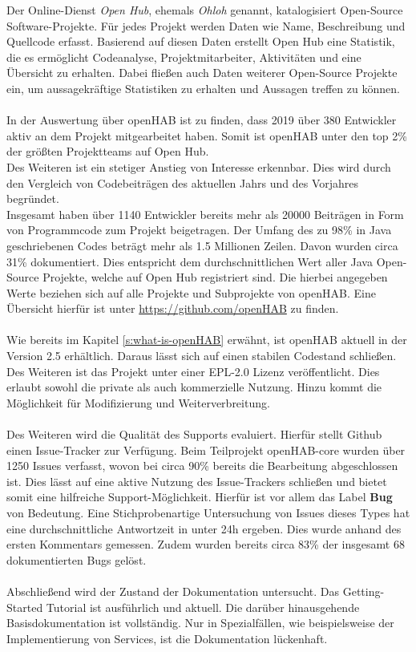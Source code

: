Der Online-Dienst \textit{Open Hub}, ehemals \textit{Ohloh} genannt, katalogisiert Open-Source Software-Projekte. Für jedes Projekt werden Daten wie Name, Beschreibung und Quellcode erfasst. Basierend auf diesen Daten erstellt Open Hub eine Statistik, die es ermöglicht Codeanalyse, Projektmitarbeiter, Aktivitäten und eine Übersicht zu erhalten. Dabei fließen auch Daten weiterer Open-Source Projekte ein, um aussagekräftige Statistiken zu erhalten und Aussagen treffen zu können.\\
\\
{In der Auswertung über openHAB ist zu finden, dass 2019 über 380 Entwickler aktiv an dem Projekt mitgearbeitet haben. Somit ist openHAB unter den top 2\% der größten Projektteams auf Open Hub.\\
Des Weiteren ist ein stetiger Anstieg von Interesse erkennbar. Dies wird durch den Vergleich von Codebeiträgen des aktuellen Jahrs und des Vorjahres begründet.\\
Insgesamt haben über 1140 Entwickler bereits mehr als 20000 Beiträgen in Form von Programmcode zum Projekt beigetragen. Der Umfang des zu 98\% in Java geschriebenen Codes beträgt mehr als 1.5 Millionen Zeilen. Davon wurden circa 31\% dokumentiert. Dies entspricht dem durchschnittlichen Wert aller Java Open-Source Projekte, welche auf Open Hub registriert sind.}\cite{OPENHUB01:OH} Die hierbei angegeben Werte beziehen sich auf alle Projekte und Subprojekte von openHAB. Eine Übersicht hierfür ist unter \url{https://github.com/openHAB} zu finden.\\
\\
Wie bereits im Kapitel \ref{s:what-is-openHAB} erwähnt, ist openHAB aktuell in der Version 2.5 erhältlich. Daraus lässt sich auf einen stabilen Codestand schließen.\\
Des Weiteren ist das Projekt unter einer EPL-2.0 Lizenz veröffentlicht. Dies erlaubt sowohl die private als auch kommerzielle Nutzung. Hinzu kommt die Möglichkeit für Modifizierung und Weiterverbreitung.\cite{LICENSE01:EC}
\\
\\
Des Weiteren wird die Qualität des Supports evaluiert. Hierfür stellt Github einen Issue-Tracker zur Verfügung. Beim Teilprojekt openHAB-core wurden über 1250 Issues verfasst, wovon bei circa 90\% bereits die Bearbeitung abgeschlossen ist.\cite{GITHUB01:OS} Dies lässt auf eine aktive Nutzung des Issue-Trackers schließen und bietet somit eine hilfreiche Support-Möglichkeit. Hierfür ist vor allem das Label \textbf{Bug} von Bedeutung. Eine Stichprobenartige Untersuchung von Issues dieses Types hat eine durchschnittliche Antwortzeit in unter 24h ergeben. Dies wurde anhand des ersten Kommentars gemessen. Zudem wurden bereits circa 83\% der insgesamt 68 dokumentierten Bugs gelöst.
\\
\\
Abschließend wird der Zustand der Dokumentation untersucht.
Das Getting-Started Tutorial ist ausführlich und aktuell. Die darüber hinausgehende Basisdokumentation ist vollständig. Nur in Spezialfällen, wie beispielsweise der Implementierung von Services, ist die Dokumentation lückenhaft.\cite{openHAB01:OH}

